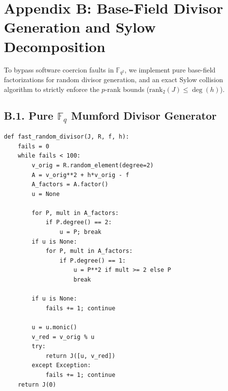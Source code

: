 \documentclass[letterpaper, 11pt]{article}
\begin{document}
\section{Appendix B: Base-Field Divisor Generation and Sylow Decomposition}
To bypass software coercion faults in $\mathbb{F}_{q^2}$, we implement pure base-field factorizations for random divisor generation, and an exact Sylow collision algorithm to strictly enforce the $p$-rank bounds ($\text{rank}_2(J) \le \deg(h)$).

\subsection{B.1. Pure \texorpdfstring{$\mathbb{F}_q$}{F\_q} Mumford Divisor Generator}
\begin{lstlisting}
def fast_random_divisor(J, R, f, h):
    fails = 0
    while fails < 100:
        v_orig = R.random_element(degree=2)
        A = v_orig**2 + h*v_orig - f
        A_factors = A.factor()
        u = None
        
        for P, mult in A_factors:
            if P.degree() == 2:
                u = P; break
        if u is None:
            for P, mult in A_factors:
                if P.degree() == 1:
                    u = P**2 if mult >= 2 else P
                    break
                    
        if u is None:
            fails += 1; continue
            
        u = u.monic()
        v_red = v_orig % u
        try:
            return J([u, v_red])
        except Exception:
            fails += 1; continue
    return J(0) 
\end{lstlisting}
\end{document}
